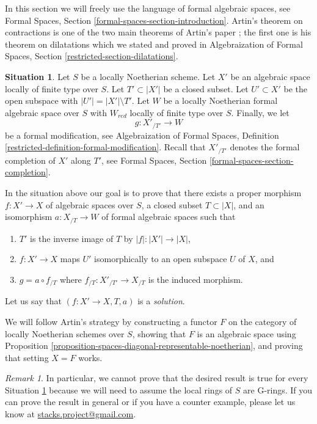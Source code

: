 \documentclass{stacks-project}
\theoremstyle{plain}
\theoremstyle{definition}
\newtheorem{situation}[subsection]{Situation}
\theoremstyle{remark}
\newtheorem{remark}[subsection]{Remark}
\numberwithin{equation}{subsection}
\begin{document}
\noindent
In this section we will freely use the language of formal algebraic spaces,
see Formal Spaces, Section \ref{formal-spaces-section-introduction}.
Artin's theorem on contractions is one of the two main theorems of
Artin's paper \cite{ArtinII}; the first one is his theorem on dilatations
which we stated and proved in Algebraization of Formal Spaces,
Section \ref{restricted-section-dilatations}.

\begin{situation}
\label{situation-contractions}
Let $S$ be a locally Noetherian scheme. Let $X'$ be an algebraic space
locally of finite type over $S$. Let $T' \subset |X'|$ be a closed
subset. Let $U' \subset X'$ be the open subspace with
$|U'| = |X'| \setminus T'$. Let $W$ be a locally Noetherian
formal algebraic space over $S$ with $W_{red}$ locally of finite type
over $S$. Finally, we let
$$
g : X'_{/T'} \longrightarrow W
$$
be a formal modification, see
Algebraization of Formal Spaces, Definition
\ref{restricted-definition-formal-modification}.
Recall that $X'_{/T'}$ denotes the formal completion of $X'$ along
$T'$, see Formal Spaces, Section \ref{formal-spaces-section-completion}.
\end{situation}

\noindent
In the situation above our goal is to prove that there exists a
proper morphism $f : X' \to X$ of algebraic spaces over $S$,
a closed subset $T \subset |X|$, and an isomorphism
$a : X_{/T} \to W$ of formal algebraic spaces such that
\begin{enumerate}
\item $T'$ is the inverse image of $T$ by $|f| : |X'| \to |X|$,
\item $f : X' \to X$ maps $U'$ isomorphically to
an open subspace $U$ of $X$, and
\item $g = a \circ f_{/T}$ where $f_{/T} : X'_{/T'} \to X_{/T}$
is the induced morphism.
\end{enumerate}
Let us say that $(f : X' \to X, T, a)$ is a {\it solution}.

\medskip\noindent
We will follow Artin's strategy by constructing a functor $F$ on
the category of locally Noetherian schemes over $S$, showing that $F$ is an
algebraic space using
Proposition \ref{proposition-spaces-diagonal-representable-noetherian},
and proving that setting $X = F$ works.

\begin{remark}
\label{remark-G-rings}
In particular, we cannot prove that the desired result is true for
every Situation \ref{situation-contractions} because we will need to
assume the local rings of $S$ are G-rings. If you can prove the
result in general or if you have a counter example, please let
us know at
\href{mailto:stacks.project@gmail.com}{stacks.project@gmail.com}.
\end{remark}
\end{document}
